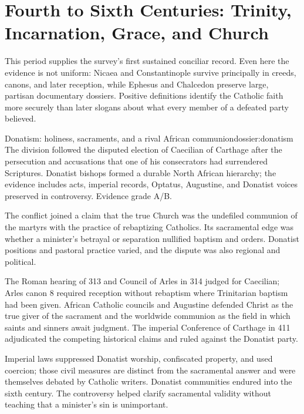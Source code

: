\section{Fourth to Sixth Centuries: Trinity, Incarnation, Grace, and Church}

This period supplies the survey's first sustained conciliar record. Even here the evidence is not uniform: Nicaea and Constantinople survive principally in creeds, canons, and later reception, while Ephesus and Chalcedon preserve large, partisan documentary dossiers. Positive definitions identify the Catholic faith more securely than later slogans about what every member of a defeated party believed.

\begin{heresydossier}{Donatism: holiness, sacraments, and a rival African communion}{dossier:donatism}
\objectfield The division followed the disputed election of Caecilian of Carthage after the persecution and accusations that one of his consecrators had surrendered Scriptures. Donatist bishops formed a durable North African hierarchy; the evidence includes acts, imperial records, Optatus, Augustine, and Donatist voices preserved in controversy. Evidence grade A/B.

\propositionfield The conflict joined a claim that the true Church was the undefiled communion of the martyrs with the practice of rebaptizing Catholics. Its sacramental edge was whether a minister's betrayal or separation nullified baptism and orders. Donatist positions and pastoral practice varied, and the dispute was also regional and political.

\responsefield The Roman hearing of 313 and Council of Arles in 314 judged for Caecilian; Arles canon 8 required reception without rebaptism where Trinitarian baptism had been given. African Catholic councils and Augustine defended Christ as the true giver of the sacrament and the worldwide communion as the field in which saints and sinners await judgment. The imperial Conference of Carthage in 411 adjudicated the competing historical claims and ruled against the Donatist party.

\aftermathfield Imperial laws suppressed Donatist worship, confiscated property, and used coercion; those civil measures are distinct from the sacramental answer and were themselves debated by Catholic writers. Donatist communities endured into the sixth century. The controversy helped clarify sacramental validity without teaching that a minister's sin is unimportant.
\end{heresydossier}

